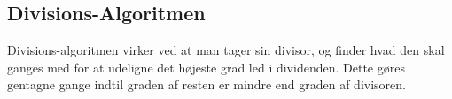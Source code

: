\subsection{Divisions-Algoritmen}

Divisions-algoritmen virker ved at man tager sin divisor, og finder hvad den skal ganges med for at udeligne det højeste grad led i dividenden. Dette gøres gentagne gange indtil graden af resten er mindre end graden af divisoren.
